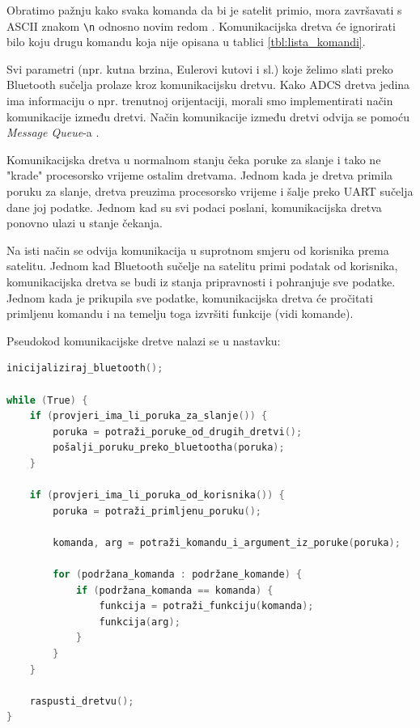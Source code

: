 \documentclass[times, utf8, diplomski, numeric]{templates/template}
\begin{document}
{{{{                Obratimo pažnju kako svaka komanda da bi je satelit primio, mora završavati s ASCII znakom \texttt{\textbackslash n} odnosno novim redom . Komunikacijska dretva će ignorirati bilo koju drugu komandu koja nije opisana u tablici \ref{tbl:lista_komandi}.

                Svi parametri (npr. kutna brzina, Eulerovi kutovi i sl.) koje želimo slati preko Bluetooth sučelja prolaze kroz komunikacijsku dretvu. Kako ADCS dretva jedina ima informaciju o npr. trenutnoj orijentaciji, morali smo implementirati način komunikacije između dretvi. Način komunikacije između dretvi odvija se pomoću \emph{Message Queue}-a \cite{message_queue}.

                Komunikacijska dretva u normalnom stanju čeka poruke za slanje i tako ne "krade" procesorsko vrijeme ostalim dretvama. Jednom kada je dretva primila poruku za slanje, dretva preuzima procesorsko vrijeme i šalje preko UART sučelja dane joj podatke. Jednom kad su svi podaci poslani, komunikacijska dretva ponovno ulazi u stanje čekanja.
                
                Na isti način se odvija komunikacija u suprotnom smjeru od korisnika prema satelitu. Jednom kad Bluetooth sučelje na satelitu primi podatak od korisnika, komunikacijska dretva se budi iz stanja pripravnosti i pohranjuje sve podatke. Jednom kada je prikupila sve podatke, komunikacijska dretva će pročitati primljenu komandu i na temelju toga izvršiti funkcije (vidi komande).

                Pseudokod komunikacijske dretve nalazi se u nastavku:

                \begin{lstlisting}[language=C]
inicijaliziraj_bluetooth();

while (True) {
    if (provjeri_ima_li_poruka_za_slanje()) {
        poruka = potraži_poruke_od_drugih_dretvi();
        pošalji_poruku_preko_bluetootha(poruka);
    }

    if (provjeri_ima_li_poruka_od_korisnika()) {
        poruka = potraži_primljenu_poruku();

        komanda, arg = potraži_komandu_i_argument_iz_poruke(poruka);

        for (podržana_komanda : podržane_komande) {
            if (podržana_komanda == komanda) {
                funkcija = potraži_funkciju(komanda);
                funkcija(arg);
            }
        }
    }

    raspusti_dretvu();
}           \end{lstlisting}

}}}}
\end{document}
